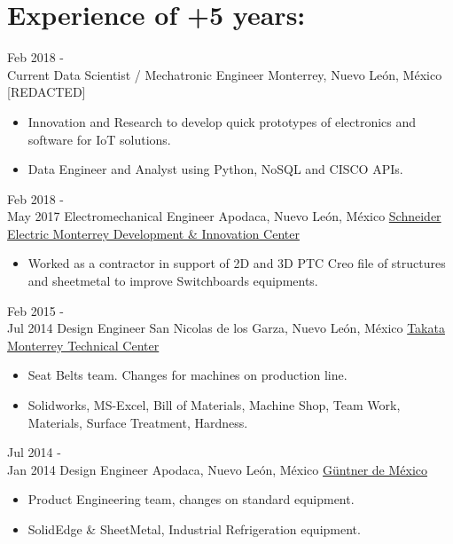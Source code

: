 \documentclass[a4paper]{twentysecondcv} %
\begin{document}
\section{Experience of +5 years:}


\begin{twenty} %

\twentyitem
        {Feb 2018 - \\Current}
        {Data Scientist / Mechatronic Engineer}
        {Monterrey, Nuevo Le\'on, M\'exico}
        {{[REDACTED]}}
        {
        {
        \begin{itemize}
        \item Innovation and Research to develop quick prototypes of electronics and software for IoT solutions.
        \item Data Engineer and Analyst using Python, NoSQL and CISCO APIs.
        \end{itemize}
        }
        }

\twentyitem
        {Feb 2018 - \\May 2017}
        {Electromechanical Engineer}
        {Apodaca, Nuevo Le\'on, M\'exico}
        {\href{http://www.schneider-electric.com.mx}{Schneider Electric Monterrey Development \& Innovation Center}}
         {
        {
        \begin{itemize}
        \item Worked as a contractor in support of 2D and 3D PTC Creo file of structures and sheetmetal to improve Switchboards equipments.
        \end{itemize}
        }
        }
        
	\twentyitem
    	{Feb 2015 - \\Jul 2014}
        {Design Engineer}
        {San Nicolas de los Garza, Nuevo Le\'on, M\'exico}
        {\href{https://en.wikipedia.org/wiki/Takata_Corporation}{Takata Monterrey Technical Center}}
        {
        {\begin{itemize}
        \item Seat Belts team. Changes for machines on production line.
        \item Solidworks, MS-Excel, Bill of Materials, Machine Shop, Team Work, Materials, Surface Treatment, Hardness.
    \end{itemize}}
        }
        
    \twentyitem
   		{Jul 2014 - \\ Jan 2014}
        {Design Engineer}
        {Apodaca, Nuevo Le\'on,  M\'exico}
        {\href{http://www.guentner.com.mx/}{G\"{u}ntner de M\'exico}}
        {
        {
        \begin{itemize}
        \item Product Engineering team, changes on standard equipment.
        \item SolidEdge \& SheetMetal, Industrial Refrigeration equipment.
        \end{itemize}
        }
        }
        

\end{twenty}
\end{document}
